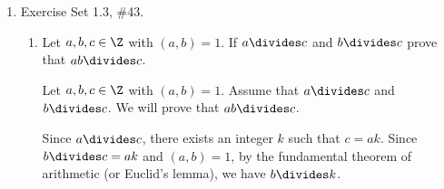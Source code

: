\begin{enumerate}
\begin{subanswer}
    Let $p = n^{2} + 1$ be a prime number. We need to show that $p \equiv 1 \pmod{4}$.
    
    Consider the possible values of $n$ modulo $4$:
    
    \textbf{Case 1:} $n \equiv 0 \pmod{4}$. Then $n = 4k$ for some integer $k$, so $n^{2} = 16k^{2} \equiv 0 \pmod{4}$. Therefore, $p = n^{2} + 1 \equiv 0 + 1 \equiv 1 \pmod{4}$.
    
    \textbf{Case 2:} $n \equiv 1 \pmod{4}$. Then $n = 4k + 1$ for some integer $k$, so $n^{2} = (4k + 1)^{2} = 16k^{2} + 8k + 1 \equiv 1 \pmod{4}$. Therefore, $p = n^{2} + 1 \equiv 1 + 1 \equiv 2 \pmod{4}$.
    
    \textbf{Case 3:} $n \equiv 2 \pmod{4}$. Then $n = 4k + 2$ for some integer $k$, so $n^{2} = (4k + 2)^{2} = 16k^{2} + 16k + 4 \equiv 0 \pmod{4}$. Therefore, $p = n^{2} + 1 \equiv 0 + 1 \equiv 1 \pmod{4}$.
    
    \textbf{Case 4:} $n \equiv 3 \pmod{4}$. Then $n = 4k + 3$ for some integer $k$, so $n^{2} = (4k + 3)^{2} = 16k^{2} + 24k + 9 \equiv 1 \pmod{4}$. Therefore, $p = n^{2} + 1 \equiv 1 + 1 \equiv 2 \pmod{4}$.
    
    However, if $p \equiv 2 \pmod{4}$, then $p$ is even and greater than $2$ (since $n > 1$), which means $p$ is composite, contradicting our assumption that $p$ is prime.
    
    Therefore, the only valid cases are when $n \equiv 0 \pmod{4}$ or $n \equiv 2 \pmod{4}$, both of which give $p \equiv 1 \pmod{4}$.
    
    We conclude that if $n^{2} + 1$ is prime, then $n^{2} + 1$ is expressible in the form $4k + 1$ for some integer $k$.
  \end{subanswer}

  \newpage

  \item Exercise Set 1.3, \#43.
  \begin{enumerate}
    \item Let $a,b,c \in \Z$ with $(a,b)=1$. If $a \divides c$ and $b\divides c$ prove that $ab\divides c$.
    \begin{subanswer}
      Let $a,b,c \in \Z$ with $(a,b) = 1$. Assume that $a \divides c$ and $b \divides c$. We will prove that $ab \divides c$.
      
      Since $a \divides c$, there exists an integer $k$ such that $c = ak$. Since $b \divides c = ak$ and $(a,b) = 1$, by the fundamental theorem of arithmetic (or Euclid's lemma), we have $b \divides k$.
      

\end{subanswer}
\end{enumerate}
\end{enumerate}
